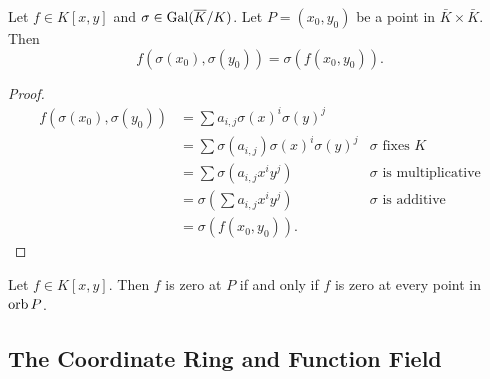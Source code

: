\begin{lemma}
  \label{lem_galois_action_on_polynomial}
  Let $f \in K[x,y]$ and $\sigma \in \operatorname{Gal}(\overline K/K)$.
  Let $P = (x_0, y_0)$ be a point in $\bar K \times \bar K$. Then
  \[ f(\sigma(x_0), \sigma(y_0)) = \sigma(f(x_0, y_0)). \]
\end{lemma}
\begin{proof}
  \begin{align*}
    f(\sigma(x_0), \sigma(y_0))
      &= \sum a_{i,j}\sigma(x)^i\sigma(y)^j \\
      &= \sum \sigma(a_{i,j})\sigma(x)^i\sigma(y)^j
        & \text{$\sigma$ fixes $K$} \\
      &= \sum \sigma(a_{i,j}x^iy^j)
        & \text{$\sigma$ is multiplicative} \\
      &= \sigma \left( \sum a_{i,j}x^iy^j \right)
        & \text{$\sigma$ is additive} \\
      &= \sigma(f(x_0, y_0)).
  \end{align*}
\end{proof}
\begin{corollary}
  \label{cor_orb}
  Let $f \in K[x,y]$.
  Then $f$ is zero at $P$ if and only if $f$ is zero at every point in $\operatorname{orb} P$.
\end{corollary}
\begin{comment}
\begin{corollary}
  \label{cor_orb}
  Let $f \in K[x,y]$ and $\sigma \in \Gal(\bar K/K)$.
  Let $P$ be an affine point.
  Then $f$ has a zero at $P$ if and only if $f$ has a zero at $\sigma(P)$.
\end{corollary}
\begin{proof}
  ($\implies$) Suppose $f$ has a zero at a point $P = (x_0, y_0)$,
  i.e. $f(x_0, y_0) = 0$.
  Then at $\sigma(P)$,
  \[ f(\sigma(x_0), \sigma(y_0)) = \sigma(f(x_0, y_0)) = \sigma(0) = 0. \]  

  ($\impliedby$) Suppose $f$ has a zero at $\sigma(P)$, i.e. $f(\sigma(x_0), \sigma(y_0)) = 0$.
  Then $\sigma$ has an inverse $\sigma\inv \in \Gal(\bar K/K)$ and
  \[ f(x_0, y_0) = \sigma\inv(\sigma(f(x_0, y_0))) = \sigma\inv(f(\sigma(x_0), \sigma(y_0))) = \sigma\inv(0) = 0. \] 
\end{proof}
\end{comment}


\subsection{The Coordinate Ring and Function Field}

